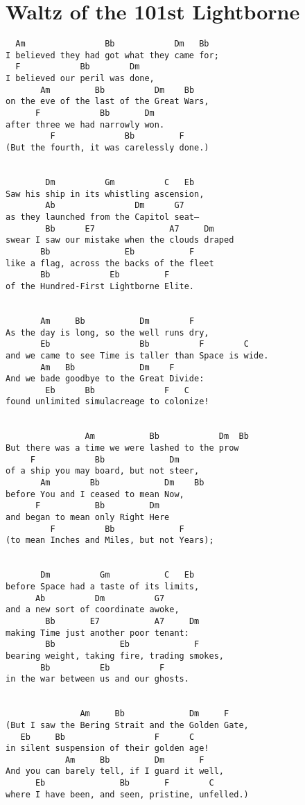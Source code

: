 \documentclass[leqno]{memoir}
\begin{document}
\chapter{Waltz of the 101st Lightborne}
\begin{verbatim}
  Am                Bb            Dm   Bb
I believed they had got what they came for;
  F            Bb        Dm
I believed our peril was done,
       Am         Bb          Dm    Bb
on the eve of the last of the Great Wars,
      F            Bb       Dm
after three we had narrowly won.
         F              Bb         F
(But the fourth, it was carelessly done.)


        Dm          Gm          C   Eb
Saw his ship in its whistling ascension,
        Ab                Dm      G7
as they launched from the Capitol seat—
        Bb      E7               A7     Dm
swear I saw our mistake when the clouds draped
       Bb               Eb           F
like a flag, across the backs of the fleet
       Bb            Eb         F
of the Hundred-First Lightborne Elite.


       Am     Bb           Dm        F
As the day is long, so the well runs dry,
       Eb                  Bb          F        C
and we came to see Time is taller than Space is wide.
       Am   Bb             Dm    F
And we bade goodbye to the Great Divide:
        Eb      Bb              F   C
found unlimited simulacreage to colonize!


                Am           Bb            Dm  Bb
But there was a time we were lashed to the prow
     F            Bb             Dm
of a ship you may board, but not steer,
       Am        Bb             Dm    Bb
before You and I ceased to mean Now,
      F           Bb         Dm
and began to mean only Right Here
         F          Bb             F
(to mean Inches and Miles, but not Years);


       Dm          Gm           C   Eb
before Space had a taste of its limits,
      Ab          Dm          G7
and a new sort of coordinate awoke,
        Bb       E7           A7     Dm
making Time just another poor tenant:
        Bb             Eb             F
bearing weight, taking fire, trading smokes,
       Bb          Eb          F
in the war between us and our ghosts.


               Am     Bb             Dm     F
(But I saw the Bering Strait and the Golden Gate,
   Eb     Bb                  F      C
in silent suspension of their golden age!
            Am     Bb         Dm       F
And you can barely tell, if I guard it well,
      Eb               Bb       F        C
where I have been, and seen, pristine, unfelled.)



\end{verbatim}
\end{document}
